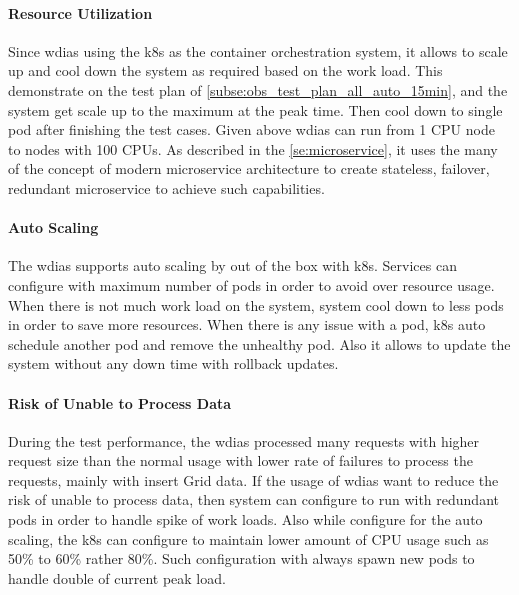 \paragraph{Resource Utilization}
Since \acrshort{wdias} using the \acrshort{k8s} as the container orchestration system, it allows to scale up and cool down the system as required based on the work load. This demonstrate on the test plan of \ref{subse:obs_test_plan_all_auto_15min}, and the system get scale up to the maximum at the peak time. Then cool down to single pod after finishing the test cases.
Given above \acrshort{wdias} can run from 1 CPU node to nodes with 100 CPUs. As described in the \ref{se:microservice}, it uses the many of the concept of modern microservice architecture to create stateless, failover, redundant microservice to achieve such capabilities.

\paragraph{Auto Scaling}
The \acrshort{wdias} supports auto scaling by out of the box with \acrshort{k8s}. Services can configure with maximum number of pods in order to avoid over resource usage. When there is not much work load on the system, system cool down to less pods in order to save more resources. When there is any issue with a pod, \acrshort{k8s} auto schedule another pod and remove the unhealthy pod. Also it allows to update the system without any down time with rollback updates.

\paragraph{Risk of Unable to Process Data}
During the test performance, the \acrshort{wdias} processed many requests with higher request size than the normal usage with lower rate of failures to process the requests, mainly with insert Grid data. If the usage of \acrshort{wdias} want to reduce the risk of unable to process data, then system can configure to run with redundant pods in order to handle spike of work loads. Also while configure for the auto scaling, the \acrshort{k8s} can configure to maintain lower amount of CPU usage such as 50\% to 60\% rather 80\%. Such configuration with always spawn new pods to handle double of current peak load.
